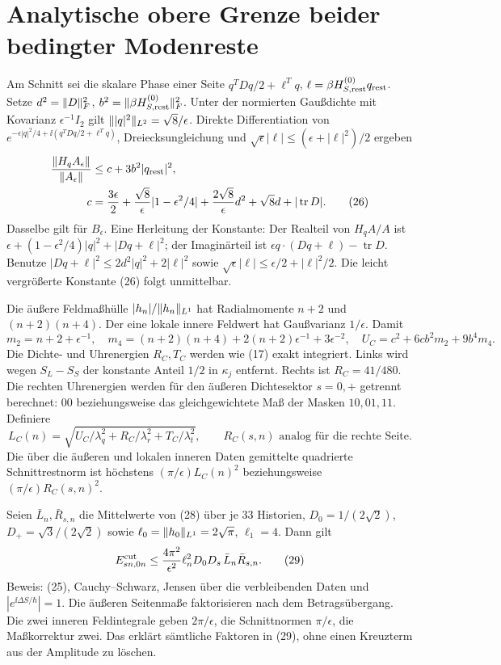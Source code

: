 \documentclass[10pt,a4paper]{article}
\begin{document}
\section{Analytische obere Grenze beider bedingter Modenreste}
Am Schnitt sei die skalare Phase einer Seite $q^TDq/2+\ell^Tq$,
$\ell=\beta H^{(0)}_{S,\mathrm{rest}}q_{\rm rest}$. Setze
$d^2=\lVert D\rVert_F^2$, $b^2=\lVert\beta H^{(0)}_{S,\mathrm{rest}}\rVert_F^2$.
Unter der normierten Gaußdichte mit Kovarianz $\epsilon^{-1}I_2$ gilt
$\lVert|q|^2\rVert_{L^2}=\sqrt8/\epsilon$. Direkte Differentiation von
$e^{-\epsilon|q|^2/4+\ii(q^TDq/2+\ell^Tq)}$, Dreiecksungleichung und
$\sqrt\epsilon|\ell|\le(\epsilon+|\ell|^2)/2$ ergeben
\begin{align}
 \frac{\lVert H_q A_\epsilon\rVert}{\lVert A_\epsilon\rVert}
 &\le c+3b^2|q_{\rm rest}|^2,\notag\\
 c&=\frac{3\epsilon}{2}+\frac{\sqrt8}{\epsilon}|1-\epsilon^2/4|
 +\frac{2\sqrt8}{\epsilon}d^2+\sqrt8 d+|\operatorname{tr}D|. \tag{26}
\end{align}
Dasselbe gilt für $B_\epsilon$. Eine Herleitung der Konstante: Der Realteil
von $H_qA/A$ ist $\epsilon+(1-\epsilon^2/4)|q|^2+|Dq+\ell|^2$;
der Imaginärteil ist $\epsilon q\cdot(Dq+\ell)-\operatorname{tr}D$.
Benutze $|Dq+\ell|^2\le2d^2|q|^2+2|\ell|^2$ sowie
$\sqrt\epsilon|\ell|\le\epsilon/2+|\ell|^2/2$. Die leicht vergrößerte
Konstante (26) folgt unmittelbar.

Die äußere Feldmaßhülle $|h_n|/\lVert h_n\rVert_{L^1}$ hat Radialmomente
$n+2$ und $(n+2)(n+4)$. Der eine lokale innere Feldwert hat Gaußvarianz
$1/\epsilon$. Damit
\[
 m_2=n+2+\epsilon^{-1},\quad
 m_4=(n+2)(n+4)+2(n+2)\epsilon^{-1}+3\epsilon^{-2},\quad
 U_C=c^2+6cb^2m_2+9b^4m_4.                               \tag{27}
\]
Die Dichte- und Uhrenergien $R_C,T_C$ werden wie (17) exakt integriert.
Links wird wegen $S_L-S_S$ der konstante Anteil $1/2$ in $\kappa_j$
entfernt. Rechts ist $R_C=41/480$. Die rechten Uhrenergien werden für den
äußeren Dichtesektor $s=0,+$ getrennt berechnet: $00$ beziehungsweise das
gleichgewichtete Maß der Masken $10,01,11$. Definiere
\[
 L_C(n)=\sqrt{U_C/\lambda_q^2+R_C/\lambda_r^2+T_C/\lambda_t^2},
 \qquad R_C(s,n)\text{ analog für die rechte Seite}.        \tag{28}
\]
Die über die äußeren und lokalen inneren Daten gemittelte quadrierte
Schnittrestnorm ist höchstens $(\pi/\epsilon)L_C(n)^2$ beziehungsweise
$(\pi/\epsilon)R_C(s,n)^2$.

Seien $\bar L_n,\bar R_{s,n}$ die Mittelwerte von (28) über je 33 Historien,
$D_0=1/(2\sqrt2)$, $D_+=\sqrt3/(2\sqrt2)$ sowie
$\ell_0=\lVert h_0\rVert_{L^1}=2\sqrt\pi$, $\ell_1=4$. Dann gilt
\[
 E^{\rm cut}_{s n,0 n}\le
 \frac{4\pi^2}{\epsilon^2}\ell_n^2 D_0D_s\,\bar L_n\bar R_{s,n}.       \tag{29}
\]
Beweis: (25), Cauchy--Schwarz, Jensen über die verbleibenden Daten und
$|e^{\ii\Delta S/\hbar}|=1$. Die äußeren Seitenmaße faktorisieren nach dem
Betragsübergang. Die zwei inneren Feldintegrale geben $2\pi/\epsilon$,
die Schnittnormen $\pi/\epsilon$, die Maßkorrektur zwei. Das erklärt
sämtliche Faktoren in (29), ohne einen Kreuzterm aus der Amplitude zu löschen.
\newpage
\end{document}
